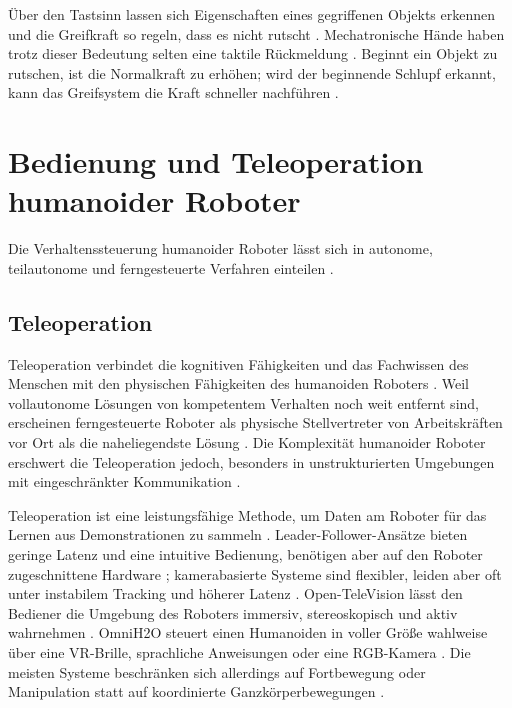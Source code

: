Über den Tastsinn lassen sich Eigenschaften eines gegriffenen Objekts erkennen und die Greifkraft so regeln, dass es nicht rutscht \cite{Romeo2020}.
Mechatronische Hände haben trotz dieser Bedeutung selten eine taktile Rückmeldung \cite{Romeo2020}.
Beginnt ein Objekt zu rutschen, ist die Normalkraft zu erhöhen; wird der beginnende Schlupf erkannt, kann das Greifsystem die Kraft schneller nachführen \cite{Romeo2020}.

\section{Bedienung und Teleoperation humanoider Roboter}
\label{sec:teleoperation_sdt}
Die Verhaltenssteuerung humanoider Roboter lässt sich in autonome, teilautonome und ferngesteuerte Verfahren einteilen \cite{Saeedvand2019} \cite{Tong2024}.

\subsection{Teleoperation}
\label{sec:teleoperation_teil}
Teleoperation verbindet die kognitiven Fähigkeiten und das Fachwissen des Menschen mit den physischen Fähigkeiten des humanoiden Roboters \cite{Darvish2023}.
Weil vollautonome Lösungen von kompetentem Verhalten noch weit entfernt sind, erscheinen ferngesteuerte Roboter als physische Stellvertreter von Arbeitskräften vor Ort als die naheliegendste Lösung \cite{Darvish2023}.
Die Komplexität humanoider Roboter erschwert die Teleoperation jedoch, besonders in unstrukturierten Umgebungen mit eingeschränkter Kommunikation \cite{Darvish2023}.

Teleoperation ist eine leistungsfähige Methode, um Daten am Roboter für das Lernen aus Demonstrationen zu sammeln \cite{Cheng2024}.
Leader-Follower-Ansätze bieten geringe Latenz und eine intuitive Bedienung, benötigen aber auf den Roboter zugeschnittene Hardware \cite{Zhao2025}; kamerabasierte Systeme sind flexibler, leiden aber oft unter instabilem Tracking und höherer Latenz \cite{Zhao2025}.
Open-TeleVision lässt den Bediener die Umgebung des Roboters immersiv, stereoskopisch und aktiv wahrnehmen \cite{Cheng2024}.
OmniH2O steuert einen Humanoiden in voller Größe wahlweise über eine VR-Brille, sprachliche Anweisungen oder eine RGB-Kamera \cite{He2024}.
Die meisten Systeme beschränken sich allerdings auf Fortbewegung oder Manipulation statt auf koordinierte Ganzkörperbewegungen \cite{Ze2025}.

